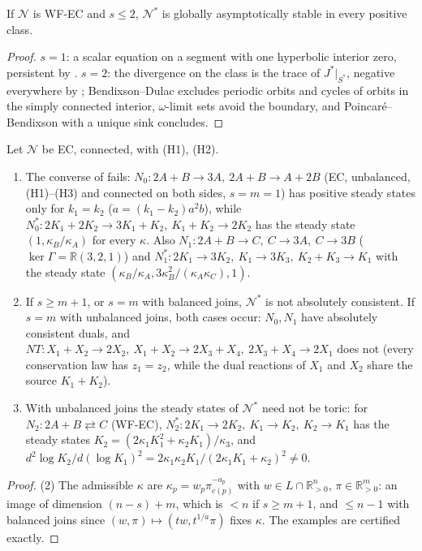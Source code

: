 \documentclass[11pt,a4paper]{report}
\newcommand{\Net}{\mathcal{N}}
\newcommand{\Nd}{\mathcal{N}^{*}}
\newcommand{\Rp}{\mathbb{R}_{>0}}
\begin{document}
\begin{proposition}[agent Q3]\label{prop:GSstar}
If \(\Net\) is WF-EC and \(s\le2\), \(\Nd\) is globally asymptotically stable in every positive class.
\end{proposition}
\begin{proof}
\(s=1\): a scalar equation on a segment with one hyperbolic interior zero, persistent by . \(s=2\): the
divergence on the class is the trace of \(J^*|_{S^*}\), negative everywhere by ; Bendixson--Dulac
excludes periodic orbits and cycles of orbits in the simply connected interior, \(\omega\)-limit sets avoid the boundary,
and Poincaré--Bendixson with a unique sink concludes.
\end{proof}

\begin{proposition}\label{prop:Tstar-cex}
Let \(\Net\) be EC, connected, with (H1), (H2).
\begin{enumerate}
\item The converse of  fails: \(N_0\colon 2A+B\to3A,\ 2A+B\to A+2B\) (EC, unbalanced, (H1)--(H3) and
connected on both sides, \(s=m=1\)) has positive steady states only for \(k_1=k_2\) (\(\dot a=(k_1-k_2)a^2b\)), while
\(N_0^*\colon 2K_1+2K_2\to3K_1+K_2,\ K_1+K_2\to2K_2\) has the steady state \((1,\kappa_B/\kappa_A)\) for every
\(\kappa\). Also \(N_1\colon 2A+B\to C,\ C\to3A,\ C\to3B\) (\(\ker\Gamma=\mathbb{R}(3,2,1)\)) and \(N_1^*\colon
2K_1\to3K_2,\ K_1\to3K_3,\ K_2+K_3\to K_1\) with the steady state \((\kappa_B/\kappa_A,3\kappa_B^2/(\kappa_A\kappa_C),1)\).
\item If \(s\ge m+1\), or \(s=m\) with balanced joins, \(\Nd\) is not absolutely consistent. If \(s=m\) with unbalanced
joins, both cases occur: \(N_0,N_1\) have absolutely consistent duals, and \(NT\colon X_1+X_2\to2X_2,\
X_1+X_2\to2X_3+X_4,\ 2X_3+X_4\to2X_1\) does not (every conservation law has \(z_1=z_2\), while the dual reactions of
\(X_1\) and \(X_2\) share the source \(K_1+K_2\)).
\item With unbalanced joins the steady states of \(\Nd\) need not be toric: for \(N_2\colon 2A+B\rightleftarrows C\)
(WF-EC), \(N_2^*\colon 2K_1\to2K_2,\ K_1\to K_2,\ K_2\to K_1\) has the steady states
\(K_2=(2\kappa_1K_1^2+\kappa_2K_1)/\kappa_3\), and \(d^2\log K_2/d(\log K_1)^2=2\kappa_1\kappa_2K_1/(2\kappa_1K_1+\kappa_2)^2\neq0\).
\end{enumerate}
\end{proposition}
\begin{proof}
(2) The admissible \(\kappa\) are \(\kappa_p=w_p\pi_{c(p)}^{-a_p}\) with \(w\in L\cap\Rp^n\), \(\pi\in\Rp^m\): an image of
dimension \((n-s)+m\), which is \(<n\) if \(s\ge m+1\), and \(\le n-1\) with balanced joins since \((w,\pi)\mapsto
(tw,t^{1/a}\pi)\) fixes \(\kappa\). The examples are certified exactly.
\end{proof}
\end{document}
